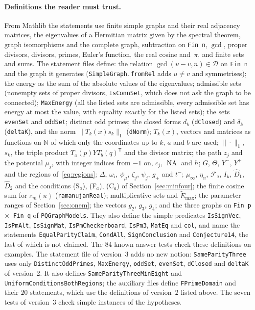 \documentclass[11pt]{article}
\theoremstyle{remark}
\newcommand{\NA}{\operatorname{NA}}
\begin{document}
\paragraph{Definitions the reader must trust.}
From Mathlib the statements use finite simple graphs and their real adjacency
matrices, the eigenvalues of a Hermitian matrix given by the spectral theorem, graph
isomorphisms and the complete graph, subtraction on \texttt{Fin n}, $\gcd$, proper
divisors, divisors, primes, Euler's function, the real cosine and~$\pi$, and finite
sets and sums. The statement files define: the relation $\gcd(u-v,n)\in\mathcal D$ on
\texttt{Fin n} and the graph it generates (\texttt{SimpleGraph.fromRel} adds $u\ne v$
and symmetrises); the energy as the sum of the absolute values of the eigenvalues;
admissible sets (nonempty sets of proper divisors, \texttt{IsConnSet}, which does not
ask the graph to be connected); \texttt{MaxEnergy} (all the listed sets are admissible,
every admissible set has energy at most the value, with equality exactly for the
listed sets); the sets \texttt{evenSet} and \texttt{oddSet}; distinct odd primes; the
closed forms $d_k$ (\texttt{dClosed}) and $\delta_k$ (\texttt{deltaK}), and the norm
$\|T_k(x)s_k\|_1$ (\texttt{dNorm}); $T_k(x)$, vectors and matrices as functions on
$\mathbb N$ of which only the coordinates up to $k$, $a$ and $b$ are used; $\|\cdot\|_1$,
$s_k$, the triple product $T_a(p)YT_b(q)^{\mathsf T}$ and the divisor matrix; the path
$z_j$ and the potential $\mu_j$, with integer indices from $-1$ on, $c_j$, $\NA$ and
$h$; $G$, $\Theta$, $Y^-$, $Y^+$ and the regions of~\eqref{eq:regions}; $\Delta$,
$\omega_i$, $\psi_\mu$, $\zeta_j$, $\psi_j$, $g_+$ and $t^-$; $\mu_\infty$, $\eta_n$,
$\mathcal F_a$, $I_k$, $\hat D_1$, $\hat D_2$ and the conditions (S$_a$), (F$_a$),
(C$_a$) of Section~\ref{sec:minfour}; the finite cosine sum for $c_m(u)$
(\texttt{ramanujanReal}); multiplicative sets and $\tilde E_{\max}$; the parameter
ranges of Section~\ref{sec:onem}; the vectors $g_2$, $g_3$, $g_4$; and the three
graphs on \texttt{Fin p $\times$ Fin q} of \texttt{PQGraphModels}. They also define the
simple predicates \texttt{IsSignVec}, \texttt{IsPmAlt}, \texttt{IsSignMat},
\texttt{IsPmCheckerboard}, \texttt{IsPm3}, \texttt{MatEq} and \texttt{col}, and name the
statements \texttt{EqualParityClaim}, \texttt{CondAll}, \texttt{SignConclusion} and
\texttt{Conjecture14}, the last of which is not claimed. The $84$ known-answer
tests check these definitions on examples. The statement file of version~3 adds no
new notion: \texttt{SameParityThree} uses only \texttt{DistinctOddPrimes},
\texttt{MaxEnergy}, \texttt{oddSet}, \texttt{evenSet}, \texttt{dClosed} and
\texttt{deltaK} of version~2. It also defines \texttt{SameParityThreeMinEight} and
\texttt{UniformConditionsBothRegions}; the auxiliary files define
\texttt{FPrimeDomain} and their $20$ statements, which use the definitions of
version~2 listed above. The seven tests of version~3 check simple instances of the
hypotheses.
\end{document}
